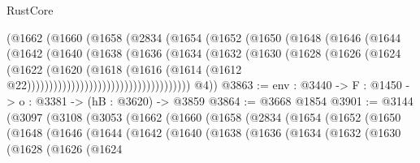 \begin{lexlean}{RustCore}
\begin{coremodule}
                              (@1662
                                (@1660
                                  (@1658
                                    (@2834
                                      (@1654
                                        (@1652
                                          (@1650
                                            (@1648
                                              (@1646
                                                (@1644
                                                  (@1642
                                                    (@1640
                                                      (@1638
                                                        (@1636
                                                          (@1634
                                                            (@1632
                                                              (@1630
                                                                (@1628
                                                                  (@1626
                                                                    (@1624
                                                                      (@1622
                                                                        (@1620
                                                                          (@1618
                                                                            (@1616
                                                                              (@1614
                                                                                (@1612
                                                                                  @22)))))))))))))))))))))))))))))))))))))
        @4))
@3863 := {env : @3440} -> {F : @1450} -> {o : @3381} -> (hB : @3620) -> @3859
@3864 := @3668 @1854
@3901 := @3144
    (@3097
      (@3108
        (@3053
          (@1662
            (@1660
              (@1658
                (@2834
                  (@1654
                    (@1652
                      (@1650
                        (@1648
                          (@1646
                            (@1644
                              (@1642
                                (@1640
                                  (@1638
                                    (@1636
                                      (@1634
                                        (@1632
                                          (@1630
                                            (@1628
                                              (@1626
                                                (@1624

\end{coremodule}
\end{lexlean}
